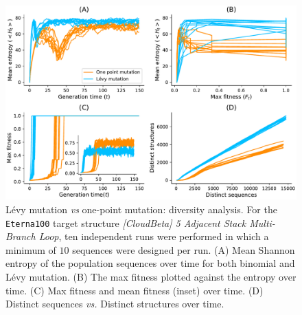 \begin{figure}[b!]
	\centering
	\includegraphics[width=1.0\linewidth]{../res/images/arnaque/diversity.pdf}
	\small
	\caption{Lévy mutation \emph{vs} one-point mutation: diversity analysis. For the \texttt{Eterna100} target structure \textit{[CloudBeta] 5 Adjacent Stack Multi-Branch Loop}, ten independent runs were performed in which a minimum of $10$ sequences were designed per run.  (A) Mean Shannon entropy of the population sequences over time for both binomial and Lévy mutation. (B) The max fitness plotted against the entropy over time. (C) Max fitness and mean fitness (inset) over time. (D) Distinct sequences \emph{vs.} Distinct structures over time.}
	\label{Fig:diversity}
	
\end{figure}
